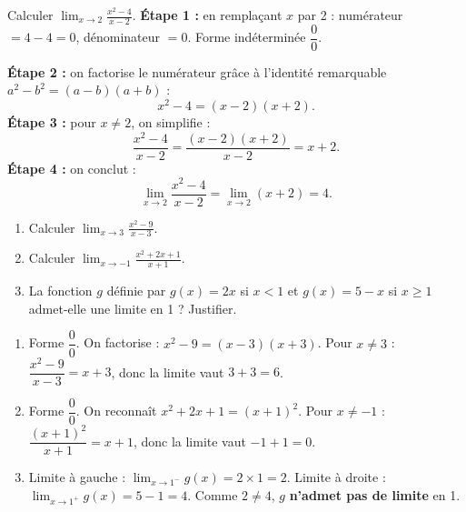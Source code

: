 \documentclass[11pt]{article}
\begin{document}
\begin{exoresolu}
Calculer $\displaystyle\lim_{x \to 2} \frac{x^2 - 4}{x - 2}$.
\tcblower
\textbf{Étape 1 :} en remplaçant $x$ par 2 : numérateur $= 4 - 4 = 0$, dénominateur $= 0$. Forme indéterminée $\dfrac{0}{0}$.

\textbf{Étape 2 :} on factorise le numérateur grâce à l'identité remarquable $a^2 - b^2 = (a-b)(a+b)$ :
\[
x^2 - 4 = (x - 2)(x + 2).
\]
\textbf{Étape 3 :} pour $x \neq 2$, on simplifie :
\[
\frac{x^2 - 4}{x - 2} = \frac{(x-2)(x+2)}{x-2} = x + 2.
\]
\textbf{Étape 4 :} on conclut :
\[
\lim_{x \to 2} \frac{x^2 - 4}{x - 2} = \lim_{x \to 2} (x + 2) = 4.
\]
\end{exoresolu}

\begin{exercice}
\begin{enumerate}
\item Calculer $\displaystyle\lim_{x \to 3} \frac{x^2 - 9}{x - 3}$.
\item Calculer $\displaystyle\lim_{x \to -1} \frac{x^2 + 2x + 1}{x + 1}$.
\item La fonction $g$ définie par $g(x) = 2x$ si $x < 1$ et $g(x) = 5 - x$ si $x \geq 1$ admet-elle une limite en 1 ? Justifier.
\end{enumerate}
\end{exercice}

\begin{corrige}[Exercice 1]
\begin{enumerate}
\item Forme $\dfrac{0}{0}$. On factorise : $x^2 - 9 = (x-3)(x+3)$. Pour $x \neq 3$ : $\dfrac{x^2-9}{x-3} = x + 3$, donc la limite vaut $3 + 3 = 6$.
\item Forme $\dfrac{0}{0}$. On reconnaît $x^2 + 2x + 1 = (x+1)^2$. Pour $x \neq -1$ : $\dfrac{(x+1)^2}{x+1} = x + 1$, donc la limite vaut $-1 + 1 = 0$.
\item Limite à gauche : $\displaystyle\lim_{x \to 1^-} g(x) = 2 \times 1 = 2$. Limite à droite : $\displaystyle\lim_{x \to 1^+} g(x) = 5 - 1 = 4$. Comme $2 \neq 4$, $g$ \textbf{n'admet pas de limite} en 1.
\end{enumerate}
\end{corrige}
\end{document}
